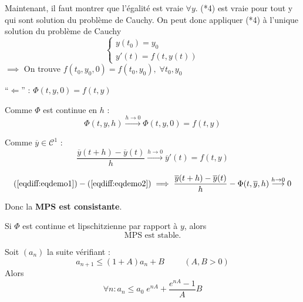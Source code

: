 \begin{preuve}
        Maintenant, il faut montrer que l'égalité est vraie $\forall y$. (*4) est vraie pour
        tout y qui sont solution du problème de Cauchy. On peut donc appliquer (*4) à
        l'unique solution du problème de Cauchy 
        \[
            \left\lbrace
            \begin{array}{c}
                y(t_0) = y_0 \\
                y'(t) = f(t,y(t))
            \end{array}\right.
        \]
        $\implies$ On trouve $f(t_0,y_0,0) = f(t_0,y_0), \; \forall t_0,y_0$

        \vspace{1.3cm}
        ``$\Longleftarrow$'' :
        $\Phi(t,y,0) = f(t,y)$

        Comme $\Phi$ est continue en $h$ :
        \begin{equation}
            \Phi(t,y,h) \overset{h\to0}{\longrightarrow} \Phi(t,y,0) = f(t,y)
            \label{eqdiff:eqdemo1}
        \end{equation}

        Comme $\overline{y} \in \mathcal{C}^1$ :
        \begin{equation}
            \frac{\overline{y}(t+h) - \overline{y}(t)}{h} \overset{h\to0}{\longrightarrow}
            \overline{y}'(t) = f(t,y)
            \label{eqdiff:eqdemo2} 
        \end{equation}

        \[
            (\ref{eqdiff:eqdemo1}) - (\ref{eqdiff:eqdemo2}) \implies
            \frac{\overline{y}(t+h) - \overline{y}(t)}{h} - \Phi(t,\overline{y},h)
            \overset{h\to0}{\longrightarrow} 0
        \]

    Donc la \textbf{MPS est consistante}.

\end{preuve}

\begin{prop}
    Si $\Phi$ est continue et lipschitzienne par rapport à $y$, alors
    \[
        \text{MPS est stable.}
    \]
\end{prop}

\begin{lemme}
    Soit $(a_n)$ la suite vérifiant :
    \[
        a_{n+1} \leq (1+A)a_n + B \hspace{1cm}(A,B > 0)
    \]
    Alors 
    \[
        \forall n : a_n \leq a_0 \; e^{nA} + \frac{e^{nA} - 1}{A}B
    \]
\end{lemme}

